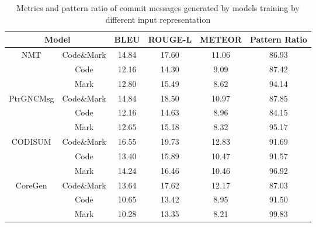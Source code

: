 \begin{table}[htbp]
\caption{Metrics and pattern ratio of commit messages generated by models training by different input representation}
\begin{tabular}{cc|cccc}
\toprule
\multicolumn{2}{c|}{Model}&BLEU&ROUGE-L&METEOR&Pattern Ratio\\
\midrule
\multirow{3}{*}{NMT}&Code\&Mark&14.84&17.60&11.06&86.93\\
~&Code&12.16&14.30&9.09&87.42\\
~&Mark&12.80&15.49&8.62&94.14\\
\midrule
\multirow{3}{*}{PtrGNCMsg}&Code\&Mark&14.84&18.50&10.97&87.85\\
~&Code&12.16&14.63&8.96&84.15\\
~&Mark&12.65&15.18&8.32&95.17\\
\midrule
\multirow{3}{*}{CODISUM}&Code\&Mark&16.55&19.73&12.83&91.69\\
~&Code&13.40&15.89&10.47&91.57\\
~&Mark&14.24&16.46&10.46&96.92\\
\midrule
\multirow{3}{*}{CoreGen}&Code\&Mark&13.64&17.62&12.17&87.03\\
~&Code&10.65&13.42&8.95&91.50\\
~&Mark&10.28&13.35&8.21&99.83\\
\bottomrule
\end{tabular}
\end{table}
